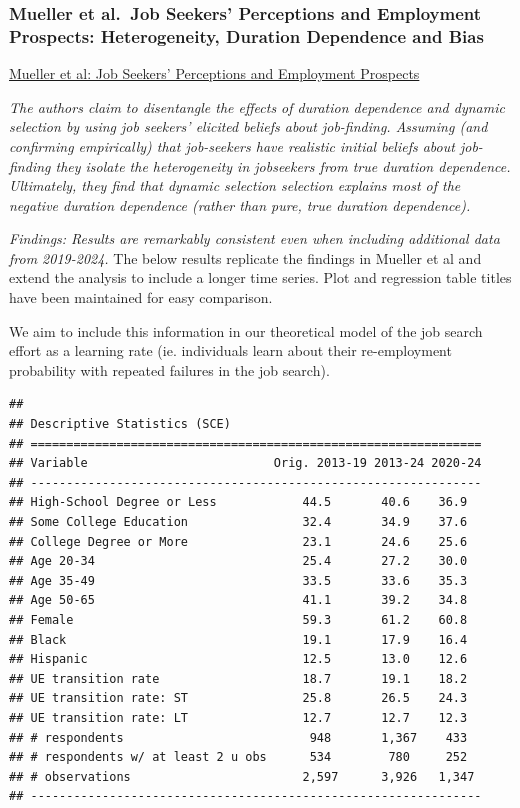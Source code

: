 \documentclass[
]{article}
\begin{document}
\subsubsection{Mueller et al.~Job Seekers' Perceptions and Employment
Prospects: Heterogeneity, Duration Dependence and
Bias}\label{mueller-et-al.-job-seekers-perceptions-and-employment-prospects-heterogeneity-duration-dependence-and-bias}

\href{https://www.aeaweb.org/articles?id=10.1257/aer.20190808}{Mueller
et al: Job Seekers' Perceptions and Employment Prospects}

\emph{The authors claim to disentangle the effects of duration
dependence and dynamic selection by using job seekers' elicited beliefs
about job-finding. Assuming (and confirming empirically) that
job-seekers have realistic initial beliefs about job-finding they
isolate the heterogeneity in jobseekers from true duration dependence.
Ultimately, they find that dynamic selection selection explains most of
the negative duration dependence (rather than pure, true duration
dependence).}

\emph{Findings: Results are remarkably consistent even when including
additional data from 2019-2024.} The below results replicate the
findings in Mueller et al and extend the analysis to include a longer
time series. Plot and regression table titles have been maintained for
easy comparison.

We aim to include this information in our theoretical model of the job
search effort as a learning rate (ie. individuals learn about their
re-employment probability with repeated failures in the job search).

\begin{verbatim}
## 
## Descriptive Statistics (SCE)
## ===============================================================
## Variable                          Orig. 2013-19 2013-24 2020-24
## ---------------------------------------------------------------
## High-School Degree or Less            44.5       40.6    36.9  
## Some College Education                32.4       34.9    37.6  
## College Degree or More                23.1       24.6    25.6  
## Age 20-34                             25.4       27.2    30.0  
## Age 35-49                             33.5       33.6    35.3  
## Age 50-65                             41.1       39.2    34.8  
## Female                                59.3       61.2    60.8  
## Black                                 19.1       17.9    16.4  
## Hispanic                              12.5       13.0    12.6  
## UE transition rate                    18.7       19.1    18.2  
## UE transition rate: ST                25.8       26.5    24.3  
## UE transition rate: LT                12.7       12.7    12.3  
## # respondents                          948       1,367    433  
## # respondents w/ at least 2 u obs      534        780     252  
## # observations                        2,597      3,926   1,347 
## ---------------------------------------------------------------
\end{verbatim}
\end{document}
